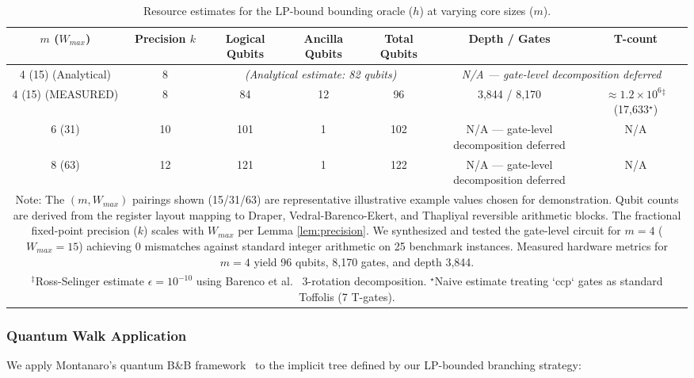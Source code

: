 \documentclass[conference]{IEEEtran} \IEEEoverridecommandlockouts
\begin{document}
\begin{table}[t]
\centering
\caption{Resource estimates for the LP-bound bounding oracle ($h$) at varying core sizes ($m$).}
\label{tab:h_resources}
\footnotesize
\begin{tabular}{ccccccc}
\hline\hline
$m$ ($W_{max}$) & Precision $k$ & Logical Qubits & Ancilla Qubits & Total Qubits & Depth / Gates & T-count \\
\hline
4 (15) (Analytical) & 8 & \multicolumn{3}{c}{\textit{(Analytical estimate: 82 qubits)}} & \multicolumn{2}{c}{\textit{N/A --- gate-level decomposition deferred}} \\
4 (15) (MEASURED) & 8 & 84 & 12 & 96 & 3,844 / 8,170 & $\approx 1.2\times 10^6$$^\ddagger$ (17,633$^\star$) \\
6 (31) & 10 & 101 & 1 & 102 & N/A --- gate-level decomposition deferred & N/A \\
8 (63) & 12 & 121 & 1 & 122 & N/A --- gate-level decomposition deferred & N/A \\
\hline\hline
\multicolumn{7}{p{0.85\textwidth}}{\footnotesize Note: The $(m, W_{max})$ pairings shown (15/31/63) are representative illustrative example values chosen for demonstration. Qubit counts are derived from the register layout mapping to Draper, Vedral-Barenco-Ekert, and Thapliyal reversible arithmetic blocks. The fractional fixed-point precision ($k$) scales with $W_{max}$ per Lemma \ref{lem:precision}. We synthesized and tested the gate-level circuit for $m=4$ ($W_{max}=15$) achieving 0 mismatches against standard integer arithmetic on 25 benchmark instances. Measured hardware metrics for $m=4$ yield 96 qubits, 8,170 gates, and depth 3,844.} \\
\multicolumn{7}{p{0.85\textwidth}}{\footnotesize $^\ddagger$Ross-Selinger estimate $\epsilon=10^{-10}$ using Barenco et al.~\cite{barenco1995} 3-rotation decomposition. $^\star$Naive estimate treating `ccp` gates as standard Toffolis (7 T-gates).} \\
\end{tabular}
\end{table}

\subsubsection{Quantum Walk Application}

We apply Montanaro's quantum B\&B framework~\cite{ref24} to the implicit tree defined by our LP-bounded branching strategy:
\end{document}
